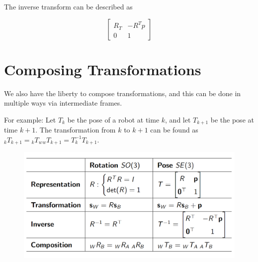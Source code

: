 The inverse transform can be described as 

\begin{equation*}
    \begin{bmatrix} R_T & - R^Tp \\ 0 & 1 \end{bmatrix} 
\end{equation*}

\section*{Composing Transformations}

We also have the liberty to compose transformations, and this can be done in multiple ways via intermediate frames.

For example: Let $T_k$ be the pose of a robot at time $k$, and let $T_{k+1}$ be the pose at time $k+1$. The transformation from $k$ to $k+1$ can be found as ${}_{k}T_{k+1} = {}_kT_{w}{}_wT_{k+1}=T_k^{-1}T_{k+1}$.

\begin{figure}[h]\centering\includegraphics[width=12cm]{img/j_3_26.png}\end{figure}



